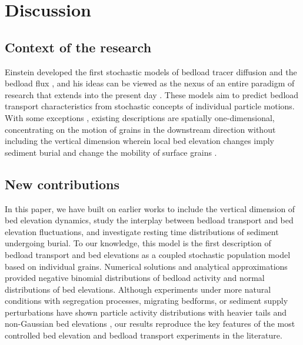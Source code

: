 \section{Discussion}
\label{sec:discussion}

\subsection{Context of the research}
Einstein developed the first stochastic models of bedload tracer diffusion \citep{Einstein1937} and the bedload flux \citep{Einstein1950}, and his ideas can be viewed as the nexus of an entire paradigm of research that extends into the present day \citep[e.g.,][]{Hubbell1964, Nakagawa1976,Hassan1991,Ancey2008, Wu2019}.
These models aim to predict bedload transport characteristics from stochastic concepts of individual particle motions.
With some exceptions \citep{Yang1971,Nakagawa1980,Pelosi2016,Wu2019,Wu2019a}, existing descriptions are spatially one-dimensional, concentrating on the motion of grains in the downstream direction without including the vertical dimension wherein local bed elevation changes imply sediment burial \citep{Voepel2013,Martin2014} and change the mobility of surface grains \citep{Yang1971,Nakagawa1980}.

\subsection{New contributions}

In this paper, we have built on earlier works \citep{Ancey2008,Martin2014} to include the vertical dimension of bed elevation dynamics, study the interplay between bedload transport and bed elevation fluctuations, and investigate resting time distributions of sediment undergoing burial.
To our knowledge, this model is the first description of bedload transport and bed elevations as a coupled stochastic population model based on individual grains.
Numerical solutions and analytical approximations provided negative binomial distributions of bedload activity and normal distributions of bed elevations.
Although experiments under more natural conditions with segregation processes,  migrating bedforms, or sediment supply perturbations have shown particle activity distributions with heavier tails \citep{Dhont2018,Saletti2015} and non-Gaussian bed elevations \citep{Singh2012,Aberle2006}, our results reproduce the key features of the most controlled bed elevation \citep{Wong2007,Martin2014} and bedload transport \citep{Heyman2016,Ancey2008} experiments in the literature.

